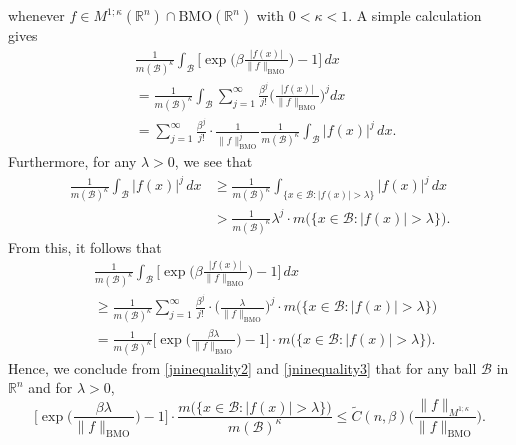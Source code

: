 \documentclass{birkjour}
\theoremstyle{definition}
\theoremstyle{remark}
\numberwithin{equation}{section}
\begin{document}
whenever $f\in M^{1;\kappa}(\mathbb R^n)\cap\mathrm{BMO}(\mathbb R^n)$ with $0<\kappa<1$. A simple calculation gives
\begin{equation*}
\begin{split}
&\frac{1}{m(\mathcal{B})^{\kappa}}\int_{\mathcal{B}}
\bigg[\exp\Big(\beta\frac{|f(x)|}{\|f\|_{\mathrm{BMO}}}\Big)-1\bigg]\,dx\\
&=\frac{1}{m(\mathcal{B})^{\kappa}}\int_{\mathcal{B}}\sum_{j=1}^{\infty}
\frac{\beta^j}{j!}\bigg(\frac{|f(x)|}{\|f\|_{\mathrm{BMO}}}\bigg)^jdx\\
&=\sum_{j=1}^{\infty}\frac{\beta^j}{j!}\cdot\frac{1}{\|f\|^j_{\mathrm{BMO}}}
\frac{1}{m(\mathcal{B})^{\kappa}}\int_{\mathcal{B}}|f(x)|^j\,dx.
\end{split}
\end{equation*}
Furthermore, for any $\lambda>0$, we see that
\begin{equation*}
\begin{split}
\frac{1}{m(\mathcal{B})^{\kappa}}\int_{\mathcal{B}}|f(x)|^j\,dx
&\geq\frac{1}{m(\mathcal{B})^{\kappa}}\int_{\{x\in \mathcal{B}:|f(x)|>\lambda\}}|f(x)|^j\,dx\\
&>\frac{1}{m(\mathcal{B})^{\kappa}}\lambda^j\cdot m\big(\big\{x\in\mathcal{B}:|f(x)|>\lambda\big\}\big).
\end{split}
\end{equation*}
From this, it follows that
\begin{equation}\label{jninequality3}
\begin{split}
&\frac{1}{m(\mathcal{B})^{\kappa}}\int_{\mathcal{B}}
\bigg[\exp\Big(\beta\frac{|f(x)|}{\|f\|_{\mathrm{BMO}}}\Big)-1\bigg]\,dx\\
&\geq\frac{1}{m(\mathcal{B})^{\kappa}}
\sum_{j=1}^{\infty}\frac{\beta^j}{j!}\cdot\bigg(\frac{\lambda}{\|f\|_{\mathrm{BMO}}}\bigg)^j
\cdot m\big(\big\{x\in\mathcal{B}:|f(x)|>\lambda\big\}\big)\\
&=\frac{1}{m(\mathcal{B})^{\kappa}}
\Big[\exp\Big(\frac{\beta\lambda}{\|f\|_{\mathrm{BMO}}}\Big)-1\Big]
\cdot m\big(\big\{x\in\mathcal{B}:|f(x)|>\lambda\big\}\big).
\end{split}
\end{equation}
Hence, we conclude from \eqref{jninequality2} and \eqref{jninequality3} that for any ball $\mathcal{B}$ in $\mathbb R^n$ and for $\lambda>0$,
\begin{equation*}
\Big[\exp\Big(\frac{\beta\lambda}{\|f\|_{\mathrm{BMO}}}\Big)-1\Big]
\cdot\frac{m\big(\big\{x\in\mathcal{B}:|f(x)|>\lambda\big\}\big)}{m(\mathcal{B})^{\kappa}}
\leq \widetilde{C}({n,\beta})\bigg(\frac{\|f\|_{M^{1;\kappa}}}{\|f\|_{\mathrm{BMO}}}\bigg).
\end{equation*}
\end{document}

